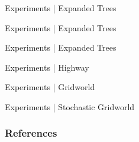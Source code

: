 \documentclass{beamer}
\begin{document}
\begin{frame}{Experiments | Expanded Trees}
    
\end{frame}

\begin{frame}{Experiments | Expanded Trees}
    
\end{frame}

\begin{frame}{Experiments | Expanded Trees}
    
\end{frame}

\begin{frame}{Experiments | Highway}
    
\end{frame}
\begin{frame}{Experiments | Gridworld}
    
\end{frame}
\begin{frame}{Experiments | Stochastic Gridworld}
    
\end{frame}

\begin{frame}
        \frametitle{References}
        \printbibliography
\end{frame}
\end{document}
